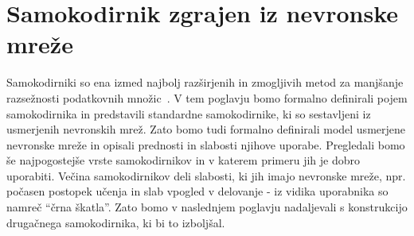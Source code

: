 \documentclass[12pt,a4paper,twoside]{article}
\theoremstyle{definition} %
\theoremstyle{plain} %
\numberwithin{equation}{section}  %
\begin{document}


\section{Samokodirnik zgrajen iz nevronske mreže} %
\label{pogl:nn_samokodirniki}

Samokodirniki so ena izmed najbolj razširjenih in zmogljivih metod za manjšanje razsežnosti podatkovnih množic~\cite{charte2018autoencoders}.
V tem poglavju bomo formalno definirali pojem samokodirnika in predstavili standardne samokodirnike, ki so sestavljeni iz usmerjenih nevronskih mrež.
Zato bomo tudi formalno definirali model usmerjene nevronske mreže in opisali prednosti in slabosti njihove uporabe.
Pregledali bomo še najpogostejše vrste samokodirnikov in v katerem primeru jih je dobro uporabiti.
Večina samokodirnikov deli slabosti, ki jih imajo nevronske mreže, npr. počasen postopek učenja in slab vpogled v delovanje - iz vidika uporabnika so namreč ``črna škatla''.
Zato bomo v naslednjem poglavju nadaljevali s konstrukcijo drugačnega samokodirnika, ki bi to izboljšal.


\end{document}

